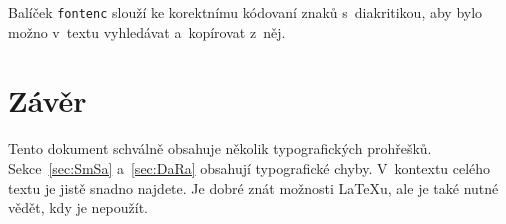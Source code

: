 \documentclass[10pt, a4paper, twocolumn]{article}
\begin{document}
Balíček \texttt{fontenc} slouží ke korektnímu kódovaní znaků s~diakritikou, aby bylo možno v~textu vyhledávat a~kopírovat z~něj.

\section{Závěr}

Tento dokument schválně obsahuje několik typografických prohřešků. Sekce~\ref{sec:SmSa} a~\ref{sec:DaRa} obsahují typografické chyby. V~kon\-textu celého textu je jistě snadno najdete. Je dobré znát možnosti \LaTeX u, ale je také nutné vědět, kdy je nepoužít.
\end{document}
